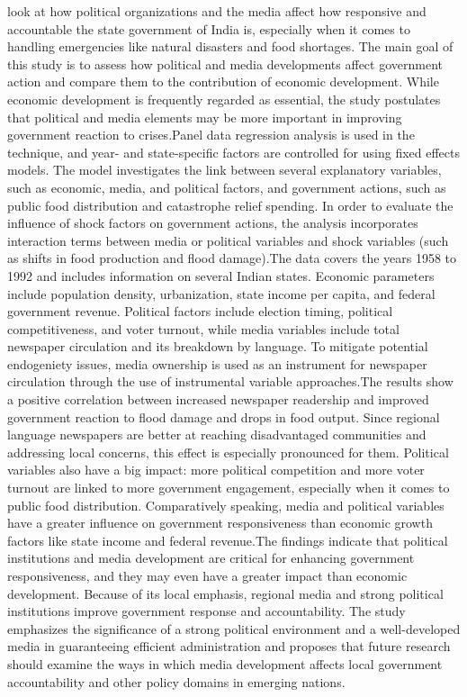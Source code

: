  look at how political organizations and the media affect how responsive and accountable the state government of India is, especially when it comes to handling emergencies like natural disasters and food shortages. The main goal of this study is to assess how political and media developments affect government action and compare them to the contribution of economic development. While economic development is frequently regarded as essential, the study postulates that political and media elements may be more important in improving government reaction to crises.Panel data regression analysis is used in the technique, and year- and state-specific factors are controlled for using fixed effects models. The model investigates the link between several explanatory variables, such as economic, media, and political factors, and government actions, such as public food distribution and catastrophe relief spending. In order to evaluate the influence of shock factors on government actions, the analysis incorporates interaction terms between media or political variables and shock variables (such as shifts in food production and flood damage).The data covers the years 1958 to 1992 and includes information on several Indian states. Economic parameters include population density, urbanization, state income per capita, and federal government revenue. Political factors include election timing, political competitiveness, and voter turnout, while media variables include total newspaper circulation and its breakdown by language. To mitigate potential endogeniety issues, media ownership is used as an instrument for newspaper circulation through the use of instrumental variable approaches.The results show a positive correlation between increased newspaper readership and improved government reaction to flood damage and drops in food output. Since regional language newspapers are better at reaching disadvantaged communities and addressing local concerns, this effect is especially pronounced for them. Political variables also have a big impact: more political competition and more voter turnout are linked to more government engagement, especially when it comes to public food distribution. Comparatively speaking, media and political variables have a greater influence on government responsiveness than economic growth factors like state income and federal revenue.The findings indicate that political institutions and media development are critical for enhancing government responsiveness, and they may even have a greater impact than economic development. Because of its local emphasis, regional media and strong political institutions improve government response and accountability. The study emphasizes the significance of a strong political environment and a well-developed media in guaranteeing efficient administration and proposes that future research should examine the ways in which media development affects local government accountability and other policy domains in emerging nations.\par
